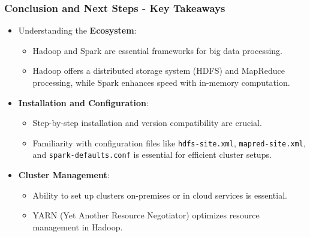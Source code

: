 \documentclass[aspectratio=169]{beamer}
\begin{document}
\begin{frame}[fragile]
    \frametitle{Conclusion and Next Steps - Key Takeaways}
    \begin{itemize}
        \item Understanding the \textbf{Ecosystem}:
        \begin{itemize}
            \item Hadoop and Spark are essential frameworks for big data processing.
            \item Hadoop offers a distributed storage system (HDFS) and MapReduce processing, while Spark enhances speed with in-memory computation.
        \end{itemize}
        
        \item \textbf{Installation and Configuration}:
        \begin{itemize}
            \item Step-by-step installation and version compatibility are crucial.
            \item Familiarity with configuration files like \texttt{hdfs-site.xml}, \texttt{mapred-site.xml}, and \texttt{spark-defaults.conf} is essential for efficient cluster setups.
        \end{itemize}
        
        \item \textbf{Cluster Management}:
        \begin{itemize}
            \item Ability to set up clusters on-premises or in cloud services is essential.
            \item YARN (Yet Another Resource Negotiator) optimizes resource management in Hadoop.
        \end{itemize}
    \end{itemize}
\end{frame}
\end{document}
